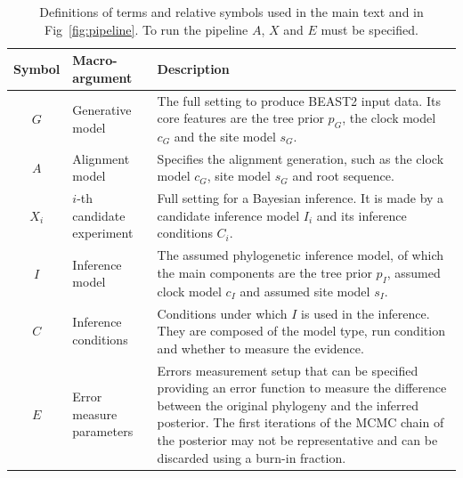 \begin{table}
  \begin{tabular}{|@{}c|p{4cm}|p{12.2cm}|}
    \hline
    \centering
    \textbf{Symbol} &
    \textbf{Macro-argument} &
    \textbf{Description} \\
    \hline
    $\mathit{G}$ &
    Generative model &
    The full setting to produce BEAST2 input data. 
    Its core features are the tree prior $\mathit{p_{G}}$, the clock 
    model $\mathit{c_{G}}$ and the site model $\mathit{s_{G}}$. \\
    $\mathit{A}$ &
    Alignment model &
    Specifies the alignment generation, such as the clock model 
    $\mathit{c_{G}}$, site model $\mathit{s_{G}}$ and root sequence. \\
    $\mathit{X_{i}}$ &
    $i$-th candidate experiment &
    Full setting for a Bayesian inference. It is made by a 
    candidate inference model $\mathit{I_{i}}$ and its 
    inference conditions $\mathit{C_{i}}$. \\
    $\mathit{I}$ &
    Inference model &
    The assumed phylogenetic inference model, of which the main components
    are the tree prior $\mathit{p_{I}}$, assumed clock model $\mathit{c_{I}}$ 
    and assumed site model $\mathit{s_{I}}$. \\
    $\mathit{C}$ & Inference conditions & Conditions under which $\mathit{I}$ 
    is used in the inference. 
    They are composed of the model type, run condition and 
    whether to measure the evidence. \\
    $\mathit{E}$ & Error measure parameters & 
    Errors measurement setup that can be specified providing an 
    error function to measure the difference between the original phylogeny 
    and the inferred posterior. The first iterations of the MCMC chain of the posterior may not be representative and can be discarded using a burn-in fraction. \\
    \hline 
  \end{tabular}
  \caption{
    Definitions of terms and relative symbols used in the main text and in 
    Fig~\ref{fig:pipeline}. To run the pipeline $\mathit{A}$, $\mathit{X}$ 
    and $\mathit{E}$ must be specified.
  }
  \label{tab:definitions}
\end{table}

